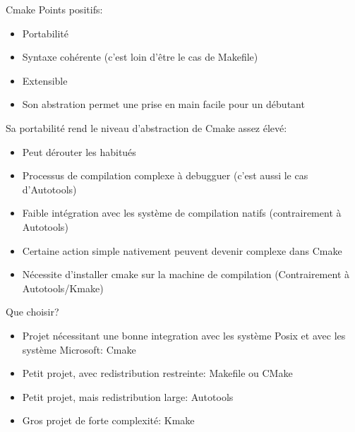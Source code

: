 \begin{frame}[fragile=singleslide]{Cmake}
  Points positifs:
  \begin{itemize}
  \item Portabilité
  \item Syntaxe cohérente (c'est loin d'être le cas de Makefile)
  \item Extensible
  \item  Son  abstration permet  une  prise  en  main facile  pour  un
    débutant
  \end{itemize}
  Sa portabilité rend le niveau d'abstraction de Cmake assez élevé:
  \begin{itemize}
  \item Peut dérouter les habitués
  \item Processus de compilation  complexe à debugguer (c'est aussi le
    cas d'Autotools)
  \item  Faible intégration  avec  les système  de compilation  natifs
    (contrairement à Autotools)
  \item  Certaine action  simple nativement  peuvent  devenir complexe
    dans Cmake
  \item  Nécessite d'installer  cmake  sur la  machine de  compilation
    (Contrairement à Autotools/Kmake)
  \end{itemize}
\end{frame}

\begin{frame}[fragile=singleslide]{Que choisir?}
  \begin{itemize}
  \item  Projet nécessitant  une  bonne integration  avec les  système
    Posix et avec les système Microsoft: Cmake
  \item  Petit  projet, avec  redistribution  restreinte: Makefile  ou
    CMake
  \item Petit projet, mais redistribution large: Autotools
  \item Gros projet de forte complexité: Kmake
  \end{itemize}
\end{frame}
